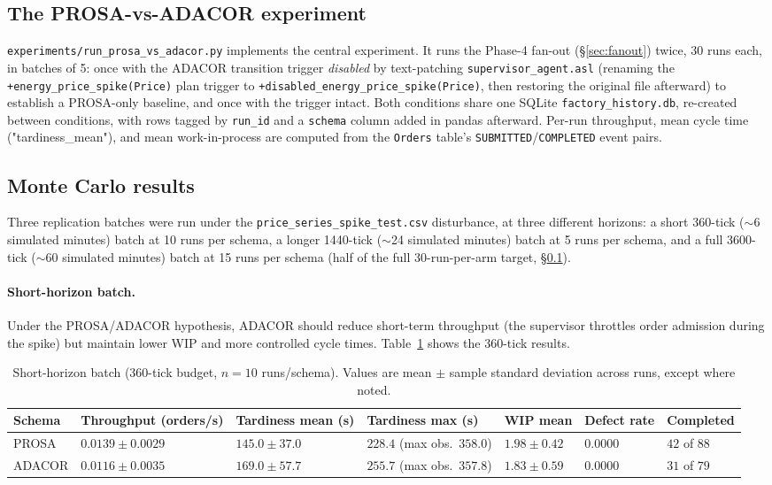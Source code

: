 \documentclass[twocolumn,10pt,a4paper]{article}
\newcommand{\code}[1]{\texttt{\small #1}}
\newcommand{\file}[1]{\texttt{#1}}
\begin{document}
\subsection{The PROSA-vs-ADACOR experiment}
\label{sec:experiment}
\file{experiments/run\_prosa\_vs\_adacor.py} implements the central experiment. It runs the Phase-4 fan-out (\S\ref{sec:fanout}) twice, 30 runs each, in batches of 5: once with the ADACOR transition trigger \emph{disabled} by text-patching \code{supervisor\_agent.asl} (renaming the \code{+energy\_price\_spike(Price)} plan trigger to \code{+disabled\_energy\_price\_spike(Price)}, then restoring the original file afterward) to establish a PROSA-only baseline, and once with the trigger intact. Both conditions share one SQLite \file{factory\_history.db}, re-created between conditions, with rows tagged by \code{run\_id} and a \code{schema} column added in pandas afterward. Per-run throughput, mean cycle time ("tardiness\_mean"), and mean work-in-process are computed from the \code{Orders} table's \code{SUBMITTED}/\code{COMPLETED} event pairs.

\subsection{Monte Carlo results}
\label{sec:mc-results}
Three replication batches were run under the \code{price\_series\_spike\_test.csv} disturbance, at three different horizons: a short 360-tick ($\sim$6 simulated minutes) batch at 10 runs per schema, a longer 1440-tick ($\sim$24 simulated minutes) batch at 5 runs per schema, and a full 3600-tick ($\sim$60 simulated minutes) batch at 15 runs per schema (half of the full 30-run-per-arm target, \S\ref{sec:experiment}).

\paragraph{Short-horizon batch.} Under the PROSA/ADACOR hypothesis, ADACOR should reduce short-term throughput (the supervisor throttles order admission during the spike) but maintain lower WIP and more controlled cycle times. Table~\ref{tab:mc-short} shows the 360-tick results.

\begin{table}[t]
\centering
\small
\begin{tabular}{@{}lp{2.1cm}p{2.1cm}p{2.1cm}p{2.1cm}p{2.1cm}p{2.3cm}@{}}
\toprule
\textbf{Schema} & \textbf{Throughput (orders/s)} & \textbf{Tardiness mean (s)} & \textbf{Tardiness max (s)} & \textbf{WIP mean} & \textbf{Defect rate} & \textbf{Completed} \\
\midrule
PROSA & $0.0139 \pm 0.0029$ & $145.0 \pm 37.0$ & $228.4$ (max obs.\ $358.0$) & $1.98 \pm 0.42$ & $0.0000$ & $42$ of $88$ \\
ADACOR & $0.0116 \pm 0.0035$ & $169.0 \pm 57.7$ & $255.7$ (max obs.\ $357.8$) & $1.83 \pm 0.59$ & $0.0000$ & $31$ of $79$ \\
\bottomrule
\end{tabular}
\caption{Short-horizon batch (360-tick budget, $n=10$ runs/schema). Values are mean $\pm$ sample standard deviation across runs, except where noted.}
\label{tab:mc-short}
\end{table}
\end{document}
